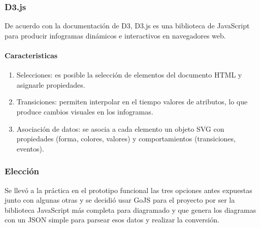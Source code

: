 \subsubsection*{D3.js}

De acuerdo con la documentación de D3\cite{d3_d3js_2020}, D3.js es una biblioteca de JavaScript para producir infogramas dinámicos e interactivos en navegadores web. 

\paragraph*{Caracteristicas}
\begin{enumerate}
    \item Selecciones: es posible la selección de elementos del documento HTML y asignarle propiedades.
    \item Transiciones:  permiten interpolar en el tiempo valores de atributos, lo que produce cambios visuales en los infogramas.
    \item Asociación de datos: se asocia a cada elemento un objeto SVG con propiedades (forma, colores, valores) y comportamientos (transiciones, eventos).
\end{enumerate}

\subsubsection*{Elección}

Se llevó a la práctica en el prototipo funcional las tres opciones antes expuestas junto con algunas otras y se decidió usar GoJS para el proyecto por ser la biblioteca JavaScript más completa para diagramado y que genera los diagramas con un JSON simple para parsear esos datos y realizar la conversión.



